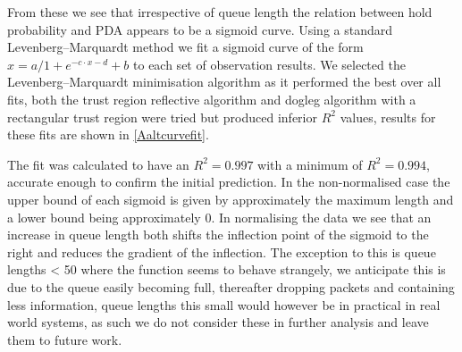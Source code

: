 From these we see that irrespective of queue length the relation between hold probability and PDA appears to be a sigmoid curve. Using a standard Levenberg–Marquardt method \cite{osborne_nonlinear_1976} we fit a sigmoid curve of the form $x=a/1+e^{-c\cdot x-d} + b$ to each set of observation results. We selected the Levenberg–Marquardt minimisation algorithm as it performed the best over all fits, both the trust region reflective algorithm and dogleg algorithm with a rectangular trust region were tried but produced inferior $R^2$ values, results for these fits are shown in \cref{Aaltcurvefit}.\par
The fit was calculated to have an $R^2=0.997$ with a minimum of $R^2=0.994$, accurate enough to confirm the initial prediction. In the non-normalised case the upper bound of each sigmoid is given by approximately the maximum length and a lower bound being approximately 0. In normalising the data we see that an increase in queue length both shifts the inflection point of the sigmoid to the right and reduces the gradient of the inflection. The exception to this is queue lengths < 50 where the function seems to behave strangely, we anticipate this is due to the queue easily becoming full, thereafter dropping packets and containing less information, queue lengths this small would however be in practical in real world systems, as such we do not consider these in further analysis and leave them to future work.\par
